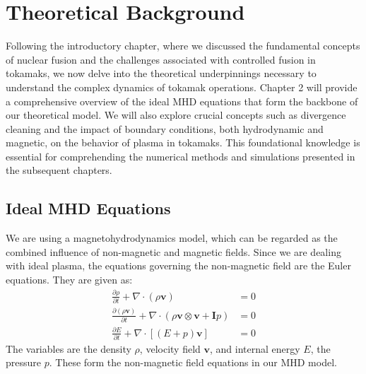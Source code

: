 
\chapter{Theoretical Background} %

\ifpdf
\graphicspath{{Chapter2/Figs/Raster/}{Chapter2/Figs/PDF/}{Chapter2/Figs/}}
\else
\graphicspath{{Chapter2/Figs/Vector/}{Chapter2/Figs/}}
\fi

\label{chapter 2}
Following the introductory chapter, where we discussed the fundamental concepts of nuclear fusion and the challenges associated with controlled fusion in tokamaks, we now delve into the theoretical underpinnings necessary to understand the complex dynamics of tokamak operations. Chapter 2 will provide a comprehensive overview of the ideal MHD equations that form the backbone of our theoretical model. We will also explore crucial concepts such as divergence cleaning and the impact of boundary conditions, both hydrodynamic and magnetic, on the behavior of plasma in tokamaks. This foundational knowledge is essential for comprehending the numerical methods and simulations presented in the subsequent chapters.
\section{Ideal MHD Equations}
\label{section2.1}
We are using a magnetohydrodynamics model, which can be regarded as the combined influence of non-magnetic and magnetic fields. Since we are dealing with ideal plasma, the equations governing the non-magnetic field are the Euler equations. They are given as:
\begin{align*}
\frac{\partial \rho}{\partial t} + \nabla \cdot (\rho \mathbf{v}) &= 0 \\
\frac{\partial (\rho \mathbf{v})}{\partial t} + \nabla \cdot \left( \rho \mathbf{v} \otimes \mathbf{v} + \mathbf{I} p \right) &= 0 \\
\frac{\partial E}{\partial t} + \nabla \cdot \left[ \left( E + p \right) \mathbf{v} \right] &= 0
\end{align*}
The variables are the density $\rho$, velocity field $\mathbf{v}$, and internal energy $E$, the pressure $p$. These form the non-magnetic field equations in our MHD model.

